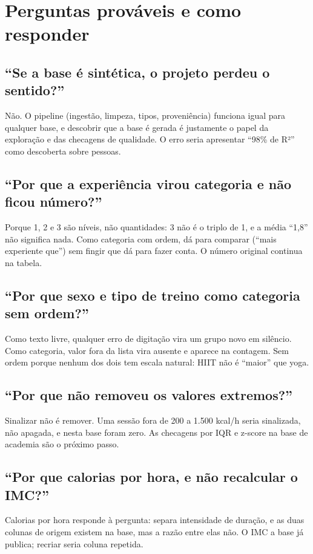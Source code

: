 \documentclass[12pt,a4paper]{article}
\begin{document}
\section{Perguntas prováveis e como responder}

\subsection*{``Se a base é sintética, o projeto perdeu o sentido?''}
Não. O pipeline (ingestão, limpeza, tipos, proveniência) funciona igual para qualquer base, e descobrir que a base é gerada é justamente o papel da exploração e das checagens de qualidade. O erro seria apresentar ``98\% de R²'' como descoberta sobre pessoas.

\subsection*{``Por que a experiência virou categoria e não ficou número?''}
Porque 1, 2 e 3 são níveis, não quantidades: 3 não é o triplo de 1, e a média ``1,8'' não significa nada. Como categoria com ordem, dá para comparar (``mais experiente que'') sem fingir que dá para fazer conta. O número original continua na tabela.

\subsection*{``Por que sexo e tipo de treino como categoria sem ordem?''}
Como texto livre, qualquer erro de digitação vira um grupo novo em silêncio. Como categoria, valor fora da lista vira ausente e aparece na contagem. Sem ordem porque nenhum dos dois tem escala natural: HIIT não é ``maior'' que yoga.

\subsection*{``Por que não removeu os valores extremos?''}
Sinalizar não é remover. Uma sessão fora de 200 a 1.500 kcal/h seria sinalizada, não apagada, e nesta base foram zero. As checagens por IQR e z-score na base de academia são o próximo passo.

\subsection*{``Por que calorias por hora, e não recalcular o IMC?''}
Calorias por hora responde à pergunta: separa intensidade de duração, e as duas colunas de origem existem na base, mas a razão entre elas não. O IMC a base já publica; recriar seria coluna repetida.
\end{document}
